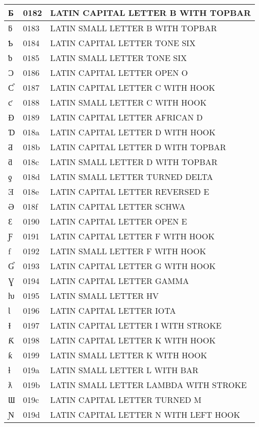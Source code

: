 \documentclass[12pt,letterpaper,openany]{book}
\begin{document}
\begin{center}
\begin{supertabular}{|m{0.25in}|m{0.5in}|m{4in}|}
			Ƃ & 0182 & LATIN CAPITAL LETTER B WITH TOPBAR\\\hline
			ƃ & 0183 & LATIN SMALL LETTER B WITH TOPBAR\\\hline
			Ƅ & 0184 & LATIN CAPITAL LETTER TONE SIX\\\hline
			ƅ & 0185 & LATIN SMALL LETTER TONE SIX\\\hline
			Ɔ & 0186 & LATIN CAPITAL LETTER OPEN O\\\hline
			Ƈ & 0187 & LATIN CAPITAL LETTER C WITH HOOK\\\hline
			ƈ & 0188 & LATIN SMALL LETTER C WITH HOOK\\\hline
			Ɖ & 0189 & LATIN CAPITAL LETTER AFRICAN D\\\hline
			Ɗ & 018a & LATIN CAPITAL LETTER D WITH HOOK\\\hline
			Ƌ & 018b & LATIN CAPITAL LETTER D WITH TOPBAR\\\hline
			ƌ & 018c & LATIN SMALL LETTER D WITH TOPBAR\\\hline
			ƍ & 018d & LATIN SMALL LETTER TURNED DELTA\\\hline
			Ǝ & 018e & LATIN CAPITAL LETTER REVERSED E\\\hline
			Ə & 018f & LATIN CAPITAL LETTER SCHWA\\\hline
			Ɛ & 0190 & LATIN CAPITAL LETTER OPEN E\\\hline
			Ƒ & 0191 & LATIN CAPITAL LETTER F WITH HOOK\\\hline
			ƒ & 0192 & LATIN SMALL LETTER F WITH HOOK\\\hline
			Ɠ & 0193 & LATIN CAPITAL LETTER G WITH HOOK\\\hline
			Ɣ & 0194 & LATIN CAPITAL LETTER GAMMA\\\hline
			ƕ & 0195 & LATIN SMALL LETTER HV\\\hline
			Ɩ & 0196 & LATIN CAPITAL LETTER IOTA\\\hline
			Ɨ & 0197 & LATIN CAPITAL LETTER I WITH STROKE\\\hline
			Ƙ & 0198 & LATIN CAPITAL LETTER K WITH HOOK\\\hline
			ƙ & 0199 & LATIN SMALL LETTER K WITH HOOK\\\hline
			ƚ & 019a & LATIN SMALL LETTER L WITH BAR\\\hline
			ƛ & 019b & LATIN SMALL LETTER LAMBDA WITH STROKE\\\hline
			Ɯ & 019c & LATIN CAPITAL LETTER TURNED M\\\hline
			Ɲ & 019d & LATIN CAPITAL LETTER N WITH LEFT HOOK\\\hline

\end{supertabular}
\end{center}
\end{document}
